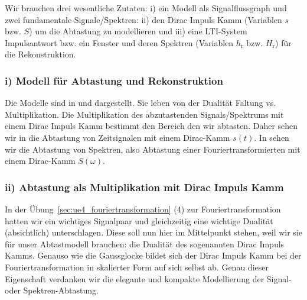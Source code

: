 Wir brauchen drei wesentliche Zutaten: i) ein Modell als Signalflussgraph und
zwei fundamentale Signale/Spektren: ii) den Dirac Impuls Kamm (Variablen $s$ bzw. $S$)
um die Abtastung zu modellieren und iii) eine LTI-System Impulsantwort bzw. ein Fenster und deren
Spektren (Variablen $h_\mathrm{r}$ bzw. $H_\mathrm{r}$) für die Rekonstruktion.

\subsubsection*{i) Modell für Abtastung und Rekonstruktion}
Die Modelle sind in 
und  dargestellt. Sie leben
von der Dualität Faltung vs. Multiplikation.
Die Multiplikation des abzutastenden Signals/Spektrums mit einem Dirac Impuls Kamm
bestimmt den Bereich den wir abtasten.
Daher sehen wir in  die Abtastung
von Zeitsignalen mit einem Dirac-Kamm $s(t)$. In 
sehen wir die Abtastung von Spektren, also Abtastung einer Fouriertransformierten
mit einem Dirac-Kamm $S(\omega)$.









\subsubsection*{ii) Abtastung als Multiplikation mit Dirac Impuls Kamm}
%
In der Übung~\ref{sec:ue4_fouriertransformation} (4)
zur Fouriertransformation hatten wir ein wichtiges
Signalpaar und gleichzeitig eine wichtige Dualität (absichtlich) unterschlagen.
%
Diese soll nun hier im Mittelpunkt stehen, weil wir sie für unser Abtastmodell
brauchen: die Dualität des sogenannten Dirac Impuls Kamms.
%
Genauso wie die Gaussglocke bildet sich der Dirac Impuls Kamm bei der
Fouriertransformation in skalierter Form auf sich selbst ab.
%
Genau dieser Eigenschaft verdanken wir die elegante und kompakte Modellierung
der Signal- oder Spektren-Abtastung.

